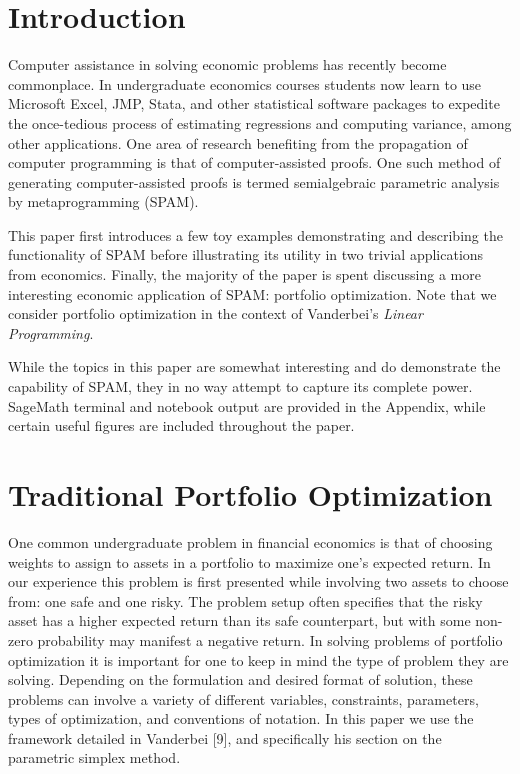 \documentclass{article}
\begin{document}
\pagebreak
{}
\section{Introduction}

Computer assistance in solving economic problems has recently become commonplace. In undergraduate economics courses students now learn to use Microsoft Excel, JMP, Stata, and other statistical software packages to expedite the once-tedious process of estimating regressions and computing variance, among other applications. One area of research benefiting from the propagation of computer programming is that of computer-assisted proofs. One such method of generating computer-assisted proofs is termed semialgebraic parametric analysis by metaprogramming (SPAM).

This paper first introduces a few toy examples demonstrating and describing the functionality of SPAM before illustrating its utility in two trivial applications from economics. Finally, the majority of the paper is spent discussing a more interesting economic application of SPAM: portfolio optimization. Note that we consider portfolio optimization in the context of Vanderbei's \textit{Linear Programming}.

While the topics in this paper are somewhat interesting and do demonstrate the capability of SPAM, they in no way attempt to capture its complete power. SageMath terminal and notebook output are provided in the Appendix, while certain useful figures are included throughout the paper.


\section{Traditional Portfolio Optimization}

One common undergraduate problem in financial economics is that of choosing weights to assign to assets in a portfolio to maximize one's expected return. In our experience this problem is first presented while involving two assets to choose from: one safe and one risky. The problem setup often specifies that the risky asset has a higher expected return than its safe counterpart, but with some non-zero probability may manifest a negative return. In solving problems of portfolio optimization it is important for one to keep in mind the type of problem they are solving. Depending on the formulation and desired format of solution, these problems can involve a variety of different variables, constraints, parameters, types of optimization, and conventions of notation. In this paper we use the framework detailed in Vanderbei [9], and specifically his section on the parametric simplex method. 
\end{document}
